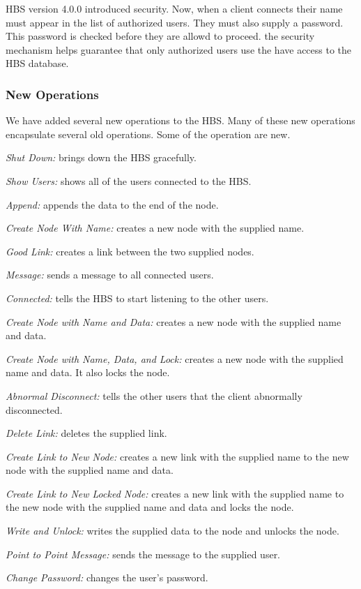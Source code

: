 HBS version 4.0.0 introduced security.  Now, when a client connects their
name must appear in the list of authorized users.  They must also supply a
password.  This password is checked before they are allowd to proceed.  the
security mechanism helps guarantee that only authorized users use the have
access to the HBS database.


\subsubsection{New Operations}

We have added several new operations to the HBS.  Many of these new
operations encapsulate several old operations.  Some of the operation are
new.

\begin{itemizenoindent}
\item{\em Shut Down:} brings down the HBS gracefully.
\item{\em Show Users:} shows all of the users connected to the HBS.
\item{\em Append:} appends the data to the end of the node.
\item{\em Create Node With Name:} creates a new node with the supplied name.
\item{\em Good Link:} creates a link between the two supplied nodes.
\item{\em Message:} sends a message to all connected users.
\item{\em Connected:} tells the HBS to start listening to the other users.
\item{\em Create Node with Name and Data:} creates a new node with the supplied
name and data.
\item{\em Create Node with Name, Data, and Lock:} creates a new node with
the supplied name and data.  It also locks the node.
\item{\em Abnormal Disconnect:} tells the other users that the client
abnormally disconnected.
\item{\em Delete Link:} deletes the supplied link.
\item{\em Create Link to New Node:} creates a new link with the supplied
name to the new node with the supplied name and data.
\item{\em Create Link to New Locked Node:} creates a new link with the
supplied name to the new node with the supplied name and data and locks the node.
\item{\em Write and Unlock:} writes the supplied data to the node and
unlocks the node.
\item{\em Point to Point Message:} sends the message to the supplied user.
\item{\em Change Password:} changes the user's password.
\end{itemizenoindent}


